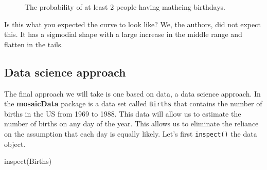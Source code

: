 \documentclass[
  letterpaper,
  DIV=11,
  numbers=noendperiod]{scrreprt}
\newenvironment{Shaded}{\begin{snugshade}}{\end{snugshade}}
\newcommand{\FunctionTok}[1]{\textcolor[rgb]{0.28,0.35,0.67}{#1}}
\newcommand{\NormalTok}[1]{\textcolor[rgb]{0.00,0.23,0.31}{#1}}
\begin{document}
\begin{figure}[H]


\caption{\label{fig-line71}The probability of at least 2 people having
mathcing birthdays.}

\end{figure}%

Is this what you expected the curve to look like? We, the authors, did
not expect this. It has a sigmodial shape with a large increase in the
middle range and flatten in the tails.

\subsection{Data science approach}\label{data-science-approach}

The final approach we will take is one based on data, a data science
approach. In the \textbf{mosaicData} package is a data set called
\texttt{Births} that contains the number of births in the US from 1969
to 1988. This data will allow us to estimate the number of births on any
day of the year. This allows us to eliminate the reliance on the
assumption that each day is equally likely. Let's first
\texttt{inspect()} the data object.

\begin{Shaded}
\begin{Highlighting}[]
\FunctionTok{inspect}\NormalTok{(Births)}
\end{Highlighting}
\end{Shaded}
\end{document}
